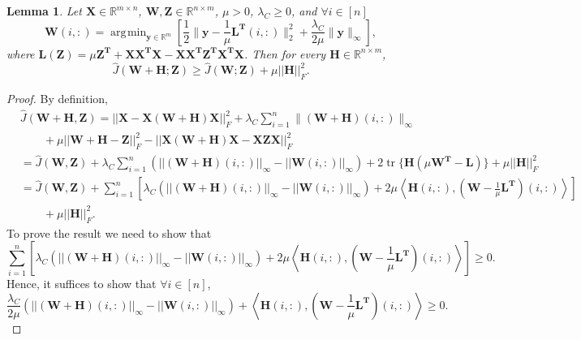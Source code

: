 \documentclass[12pt]{article}
\newtheorem{lemma}[theorem]{Lemma}
\DeclareMathOperator{\tr}{tr}
\DeclareMathOperator*{\argmin}{\arg\!\min}
\begin{document}
\begin{lemma}
\label{lem:min}
Let $\mathbf{X} \in \mathbb{R}^{m \times n}$, $\mathbf{W}, \mathbf{Z} \in  \mathbb{R}^{n \times m}$, $\mu > 0$, $\lambda_C \geq 0$, and $\forall i \in [n]$
\[
\mathbf{W}(i,:) = \argmin_{\mathbf{y} \in \mathbb{R}^{m}} 
\left[ \frac{1}{2} \|\mathbf{y} - \frac{1}{\mu}\mathbf{L^T}(i,:) \|^2_2 + \frac{\lambda_C}{2\mu}\|\mathbf{y}\|_{\infty} \right],
\]
where $\mathbf{L(Z)} = \mu \mathbf{Z^T} + \mathbf{XX^TX} - \mathbf{XX^TZ^TX^TX}$.
Then for every $\mathbf{H} \in  \mathbb{R}^{n \times m}$,
\[
\widehat{J}(\mathbf{W+H};\mathbf{Z}) \geq \widehat{J}(\mathbf{W};\mathbf{Z}) + \mu||\mathbf{H}||_F^2.
\]
\end{lemma}

\begin{proof}
By definition, 
\begin{equation*}
\begin{split}
& \widehat{J}(\mathbf{W+H}, \mathbf{Z})  = ||\mathbf{X-X(W+H)X}||_F^2 + \lambda_C \sum_{i=1}^n \| (\mathbf{W+H})(i,:) \|_{\infty} \\ 
& \quad \quad + \mu ||\mathbf{W+H}-\mathbf{Z}||_F^2 - ||\mathbf{X(W+H)X}-\mathbf{XZX}||_F^2 \\
& = \widehat{J}(\mathbf{W}, \mathbf{Z}) + \lambda_C \sum_{i=1}^n \left(||(\mathbf{W+H})(i,:)||_\infty - ||\mathbf{W}(i,:)||_\infty \right)  + 2 \tr\{\mathbf{H}(\mu \mathbf{W^T - L})\} + \mu ||\mathbf{H}||_F^2 \\
& = \widehat{J}(\mathbf{W}, \mathbf{Z}) + \sum_{i=1}^n \left[ \lambda_C(||(\mathbf{W+H})(i,:)||_\infty - ||\mathbf{W}(i,:)||_\infty) + 2\mu \left\langle \mathbf{H}(i,:), (\mathbf{W} - \frac{1}{\mu}\mathbf{L^T})(i,:) \right\rangle \right] \\
& \quad \quad + \mu ||\mathbf{H}||_F^2. 
\end{split}
\end{equation*}
To prove the result we need to show that
\[
\sum_{i=1}^n \left[ \lambda_C(||(\mathbf{W+H})(i,:)||_\infty - ||\mathbf{W}(i,:)||_\infty) + 2\mu \left\langle \mathbf{H}(i,:), (\mathbf{W} - \frac{1}{\mu}\mathbf{L^T})(i,:) \right\rangle \right] \geq 0.
\]
Hence, it suffices to show that $\forall i \in [n]$,
\begin{equation}
\label{pf:F}
\frac{\lambda_C}{2\mu} (||(\mathbf{W+H})(i,:)||_\infty - ||\mathbf{W}(i,:)||_\infty) + \left\langle \mathbf{H}(i,:), (\mathbf{W} - \frac{1}{\mu}\mathbf{L^T})(i,:) \right\rangle \geq 0.
\end{equation}


\end{proof}
\end{document}
